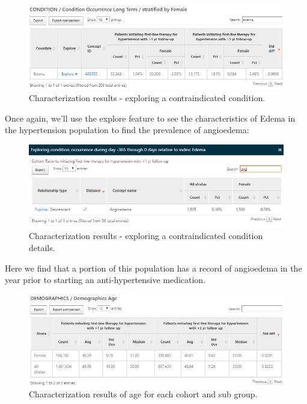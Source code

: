 \documentclass[11pt]{book}
\theoremstyle{definition}
\theoremstyle{definition}
\theoremstyle{definition}
\theoremstyle{remark}
\begin{document}
\begin{figure}

{\centering \includegraphics[width=1\linewidth]{images/Characterization/atlasCharacterizationResultsContra} 

}

\caption{Characterization results - exploring a contraindicated condition.}\label{fig:atlasCharacterizationResultsContra}
\end{figure}

Once again, we'll use the explore feature to see the characteristics of Edema in the hypertension population to find the prevalence of angioedema:

\begin{figure}

{\centering \includegraphics[width=1\linewidth]{images/Characterization/atlasCharacterizationResultsContraExplore} 

}

\caption{Characterization results - exploring a contraindicated condition details.}\label{fig:atlasCharacterizationResultsContraExplore}
\end{figure}

Here we find that a portion of this population has a record of angioedema in the year prior to starting an anti-hypertensive medication.

\begin{figure}

{\centering \includegraphics[width=1\linewidth]{images/Characterization/atlasCharacterizationResultsContinuous} 

}

\caption{Characterization results of age for each cohort and sub group.}\label{fig:atlasCharacterizationResultsContinuous}
\end{figure}
\end{document}
